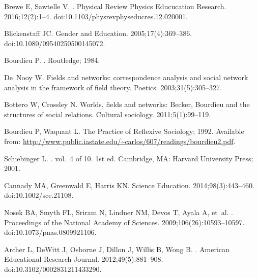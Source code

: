 \begin{thebibliography}{10}
Brewe E, Sawtelle V.
.
\newblock Physical Review Physics Educucation Research. 2016;12(2):1--4.
\newblock doi:{10.1103/physrevphyseducres.12.020001}.

Blickenstaff JC.
\newblock Gender and Education. 2005;17(4):369--386.
\newblock doi:{10.1080/09540250500145072}.

Bourdieu P.
.
\newblock Routledge; 1984.

De~Nooy W.
\newblock Fields and networks: correspondence analysis and social network
  analysis in the framework of field theory.
\newblock Poetics. 2003;31(5):305--327.

Bottero W, Crossley N.
\newblock Worlds, fields and networks: Becker, Bourdieu and the structures of
  social relations.
\newblock Cultural sociology. 2011;5(1):99--119.

Bourdieu P, Waquant L. {The Practice of Reflexive Sociology}; 1992.
\newblock Available from:
  \url{http://www.public.iastate.edu/~carlos/607/readings/bourdieu2.pdf}.

Schiebinger L.
. vol.~4 of 10.
\newblock 1st ed. Cambridge, MA: Harvard University Press; 2001.

Cannady MA, Greenwald E, Harris KN.
\newblock Science Education. 2014;98(3):443--460.
\newblock doi:{10.1002/sce.21108}.

Nosek BA, Smyth FL, Sriram N, Lindner NM, Devos T, Ayala A, et~al.
.
\newblock Proceedings of the National Academy of Sciences.
  2009;106(26):10593--10597.
\newblock doi:{10.1073/pnas.0809921106}.

Archer L, DeWitt J, Osborne J, Dillon J, Willis B, Wong B.
.
\newblock American Educational Research Journal. 2012;49(5):881--908.
\newblock doi:{10.3102/0002831211433290}.


\end{thebibliography}
